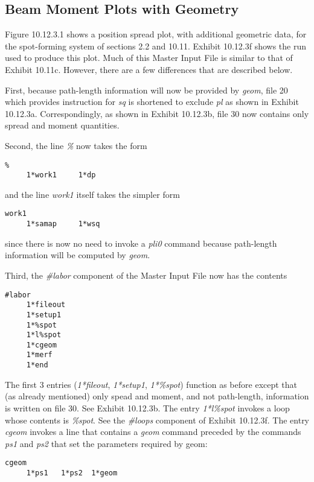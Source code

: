 \newpage
\subsection{Beam Moment Plots with Geometry}   
\label{beammomplots}
Figure 10.12.3.1 shows a position spread plot, with additional geometric data, for the
spot-forming system of sections 2.2 and 10.11.  Exhibit 10.12.3f shows
the \Mary run used to produce this plot.  Much of this Master Input File
is similar to that of Exhibit 10.11c.  However, there are a few
differences that are described below.

First, because path-length information will now be provided by {\em
geom}, file 20 which provides instruction for {\em sq} is shortened to
exclude {\em pl} as shown in Exhibit 10.12.3a.  Correspondingly, as shown
in Exhibit 10.12.3b, file 30 now contains only spread and moment
quantities.

Second, the line {\em \%} now takes the form
\begin{footnotesize}
\begin{verbatim}
%
     1*work1     1*dp
\end{verbatim}
\end{footnotesize}
and the line {\em work1} itself takes the  simpler form
\begin{footnotesize}
\begin{verbatim}
work1
     1*samap     1*wsq
\end{verbatim}
\end{footnotesize}
since there is now no need to invoke a {\em pli0} command because
path-length information will be computed by {\em geom}.

Third, the {\em \#labor} component of the Master Input File now has the
contents
\begin{footnotesize}
\begin{verbatim}
#labor
	 1*fileout
	 1*setup1
	 1*%spot
	 1*l%spot
	 1*cgeom
	 1*merf
	 1*end
\end{verbatim}
\end{footnotesize}
The first 3 entries ({\em 1*fileout}, {\em 1*setup1}, {\em 1*\%spot}) function as before
except that (as already mentioned) only spead and moment, and not path-length,
information is written on file 30.  See Exhibit 10.12.3b.  The entry
{\em 1*l\%spot} invokes a loop whose contents is {\em \%spot}.  See the
{\em \#loops} component of
Exhibit 10.12.3f.  The entry {\em cgeom} invokes a line that contains a {\em geom} command
preceded by the commands {\em ps1} and {\em ps2} that set the parameters required by geom:
\begin{footnotesize}
\begin{verbatim}
cgeom
     1*ps1   1*ps2  1*geom
\end{verbatim}
\end{footnotesize}

